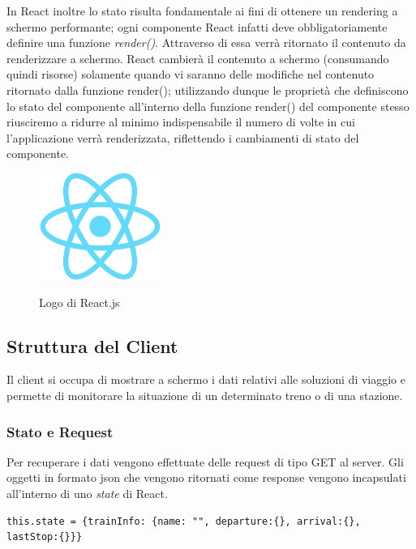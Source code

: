 \begin{itemize}
    In React inoltre lo stato risulta fondamentale ai fini di ottenere un rendering a schermo performante; ogni componente React infatti deve obbligatoriamente definire una funzione \emph{render()}.\newline
    Attraverso di essa verrà ritornato il contenuto da renderizzare a schermo.\newline
    React cambierà il contenuto a schermo (consumando quindi risorse) solamente quando vi saranno delle modifiche nel contenuto ritornato dalla funzione render(); utilizzando dunque le proprietà che definiscono lo stato del componente all'interno della funzione render() del componente stesso riusciremo a ridurre al minimo indispensabile il numero di volte in cui l'applicazione verrà renderizzata, riflettendo i cambiamenti di stato del componente.
\end{itemize}
\begin{figure}[H]
    \caption{Logo di React.js}
    \centering
    \includegraphics[width=40mm]{img/react_logo.png}
    \label{fig:react_logo}
\end{figure}

\subsection{Struttura del Client}
Il client si occupa di mostrare a schermo i dati relativi alle soluzioni di viaggio e permette di monitorare la situazione di un determinato treno o di una stazione.
\subsubsection{Stato e Request}
Per recuperare i dati vengono effettuate delle request di tipo GET al server.\newline
Gli oggetti in formato json che vengono ritornati come response vengono incapsulati all'interno di uno \textit{state} di React.
\begin{verbatim}
this.state = {trainInfo: {name: "", departure:{}, arrival:{}, lastStop:{}}}
\end{verbatim}

